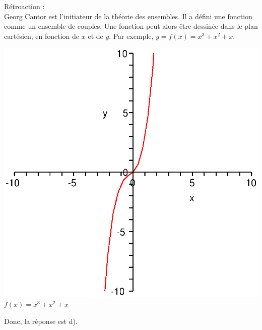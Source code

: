 \documentclass[letterpaper, 12pt]{article}
\begin{document}
R\'etroaction :\\
Georg Cantor est l'initiateur de la th\'eorie des ensembles. Il a d\'efini une fonction comme un ensemble de couples. Une fonction peut alors \^etre dessin\'ee dans le plan cart\'esien, en fonction de $x$ et de $y$. Par exemple, $y = f(x) = x^{3} + x^{2} + x$.
\begin{center}
\includegraphics[scale=0.5]{fonction.eps}\\
$f(x) = x^{3} + x^{2} + x$\\
\end{center}
Donc, la r\'eponse est d).
\end{document}
